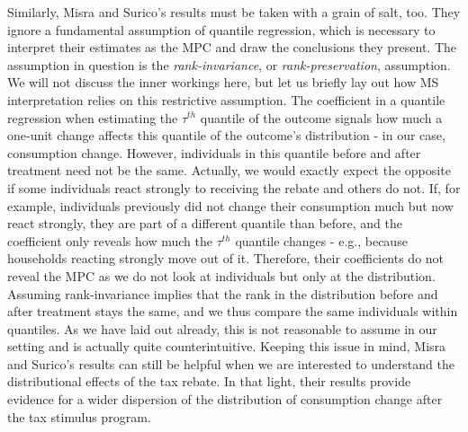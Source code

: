 Similarly, Misra and Surico's results must be taken with a grain of salt, too. They ignore a fundamental assumption of quantile regression, which is necessary to interpret their estimates as the MPC and draw the conclusions they present. The assumption in question is the \textit{rank-invariance}, or \textit{rank-preservation}, assumption. We will not discuss the inner workings here, but let us briefly lay out how MS interpretation relies on this restrictive assumption. The coefficient in a quantile regression when estimating the $\tau^{th}$ quantile of the outcome signals how much a one-unit change affects this quantile of the outcome's distribution - in our case, consumption change. However, individuals in this quantile before and after treatment need not be the same. Actually, we would exactly expect the opposite if some individuals react strongly to receiving the rebate and others do not. If, for example, individuals previously did not change their consumption much but now react strongly, they are part of a different quantile than before, and the coefficient only reveals how much the $\tau^{th}$ quantile changes - e.g., because households reacting strongly move out of it. Therefore, their coefficients do not reveal the MPC as we do not look at individuals but only at the distribution. Assuming rank-invariance implies that the rank in the distribution before and after treatment stays the same, and we thus compare the same individuals within quantiles. As we have laid out already, this is not reasonable to assume in our setting and is actually quite counterintuitive. Keeping this issue in mind, Misra and Surico's results can still be helpful when we are interested to understand the distributional effects of the tax rebate. In that light, their results provide evidence for a wider dispersion of the distribution of consumption change after the tax stimulus program.